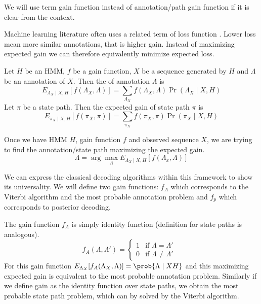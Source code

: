 \begin{note}
We will use term gain function instead of annotation/path gain function if it is
clear from the context.

Machine learning literature often uses a related term of loss function
\cite{}. Lower loss mean more similar annotations, that is higher gain. Instead
of maximizing expected gain we can therefore equivalently minimize expected
loss.
\end{note}

\begin{definition}
Let $H$ be an HMM, $f$ be a gain function, $X$ be a sequence generated by $H$ and
$\Lambda$ be an annotation of $X$. Then the  of annotation
$\Lambda$ is 
\begin{equation}
E_{\Lambda_X\mid X,H}[f(\Lambda_X,\Lambda)] =
\sum_{\Lambda_X}f(\Lambda_X,\Lambda)\Pr\left(\Lambda_X\mid X,H\right)
\end{equation}
Let $\pi$ be a state path. Then the expected gain of state path $\pi$ is 
\begin{equation}
E_{\pi_X\mid X,H}[f(\pi_X,\pi)] =
\sum_{\pi_X}f(\pi_X,\pi)\Pr\left(\pi_X\mid X,H\right)
\end{equation}

\end{definition}


Once we have HMM $H$, gain function $f$ and observed sequence $X$,
we are trying to find the annotation/state path maximizing the expected gain. 
\begin{equation}
\Lambda = \arg\max_{\Lambda}E_{\Lambda_X\mid
X,H}\left[f\left(\Lambda_x,\Lambda\right)\right]
\end{equation}

We can express the classical decoding algorithms within this framework to show
its universality. We will define two gain functions: $f_A$ which corresponds to
the  
Viterbi algorithm and the most probable annotation problem and $f_p$ which
corresponds to 
posterior decoding.

The gain function $f_A$ is simply identity function (definition for state paths
is analogous).
\begin{equation}
f_A(\Lambda,\Lambda') = \begin{cases}
1 & \text{if $\Lambda = \Lambda'$ }\\
0 & \text{if $\Lambda \not=\Lambda'$}
\end{cases}
\end{equation}
For this gain function $E_{\Lambda_X}[f_A(\Lambda_X,\Lambda)]=\prob{\Lambda\mid
X H}$ and this
maximizing expected gain is 
equivalent to the most probable annotation problem. Similarly if we define gain
as the identity function over state paths, we obtain the most probable state
path problem, which can by solved by the Viterbi algorithm.

